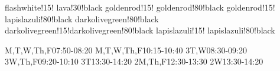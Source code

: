 \documentclass[landscape]{article}
\begin{document}
\pagestyle{fancy}
\chead{}
\CellHeight{0.75in}
\CellWidth{1.8in}
\TextSize{\centering\Large\bfseries}
\FiveDay
{}  {flashwhite!15!}    {lava!30!black}
 {goldenrod!15!}     {goldenrod!80!black}
 {goldenrod!15!}     {lapislazuli!80!black}
     {darkolivegreen!80!black}
 {darkolivegreen!15!}{darkolivegreen!80!black}
  {lapislazuli!15!}   {lapislazuli!80!black}

\begin{schedule}
    	  { }{M,T,W,Th,F}{07:50-08:20}
    	  { }{M,T,W,Th,F}{10:15-10:40}
    	  {3}{T,W}{08:30-09:20}
    	  {3}{W,Th,F}{09:20-10:10}
    	  {3}{T}{13:30-14:20}
    	  {2}{M,Th,F}{12:30-13:30}
    	  {2}{W}{13:30-14:20}
\end{schedule}
\end{document}
